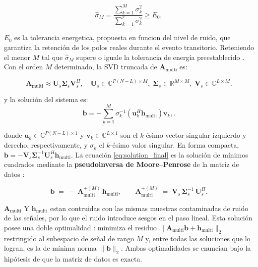 \begin{equation}
\hat{\sigma}_M = \frac{\displaystyle\sum_{k=1}^{M} \sigma_k^2}{\displaystyle\sum_{k=1}^{r} 
\sigma_k^2} \ge E_0,
\label{eq:energy}
\end{equation}

$E_0$ es la tolerancia energetica, propuesta en funcion del nivel de ruido, que 
garantiza la retención de los polos reales durante el evento transitorio. Reteniendo el 
menor $M$ tal que $\hat{\sigma}_M$ supere o iguale la tolerancia de energía preestablecido 
\cite{brunton2022}. Con el orden $M$ determinado, la SVD truncada de $\mathbf{A}_{\text{multi}}$ es:

\begin{equation}
\mathbf{A}_{\text{multi}} \approx \mathbf{U}_s \boldsymbol{\Sigma}_s \mathbf{V}_s^H,
\quad
\mathbf{U}_s \in \mathbb{C}^{P(N-L)\times M},\;
\boldsymbol{\Sigma}_s \in \mathbb{R}^{M\times M},\;
\mathbf{V}_s \in \mathbb{C}^{L\times M}.
\label{eq:truncsvd}
\end{equation}

y la solución del sistema es:
\begin{equation}
\boxed{\mathbf{b} = -\sum_{k=1}^{M} \sigma_{k}^{-1} \left(\mathbf{u}_{k}^{H}\mathbf{h}_{\text{multi}}\right) \mathbf{v}_{k},}.
\label{eq:solution_final}
\end{equation}

donde $\mathbf{u}_{k} \in \mathbb{C}^{P(N-L) \times 1}$ y $\mathbf{v}_{k} \in \mathbb{C}^{L \times 1}$ 
son el $k$-ésimo vector singular izquierdo y derecho, respectivamente, y $\sigma_k$ el $k$-ésimo 
valor singular. En forma compacta, $\mathbf{b} = -\mathbf{V}_s \mathbf{\Sigma}_s^{-1} \mathbf{U}_s^{H} 
\mathbf{h}_{\text{multi}}$. La ecuación \eqref{eq:solution_final} es la solución de mínimos cuadrados
mediante la \textbf{pseudoinversa de Moore--Penrose} de la matriz de datos \cite{brunton2022}:

\begin{equation}
    \mathbf{b}
    \;=\;
    -\,\mathbf{A}_{\mathrm{multi}}^{+(M)}\,\mathbf{h}_{\mathrm{multi}},
    \qquad
    \mathbf{A}_{\mathrm{multi}}^{+(M)}
    \;=\;
    \mathbf{V}_s\,\boldsymbol{\Sigma}_s^{-1}\,\mathbf{U}_s^H .
    \label{eq:pinv}
\end{equation} 

$\mathbf{A}_{\mathrm{multi}}$ Y $\mathbf{h}_{\mathrm{multi}}$ estan contruidas
con las mismas muestras contaminadas de ruido de las señales, por lo que el ruido 
introduce sesgos en el paso lineal. Esta solución posee una doble optimalidad \cite{brunton2022}: 
minimiza el residuo $\lVert \mathbf{A}_{\mathrm{multi}}\mathbf{b} +
\mathbf{h}_{\mathrm{multi}} \rVert_2$ restringido al subespacio de señal de
rango $M$ y, entre todas las soluciones que lo logran, es la de mínima
norma $\lVert\mathbf{b}\rVert_2$. Ambas optimalidades se enuncian bajo la hipótesis de 
que la matriz de datos es exacta. 


